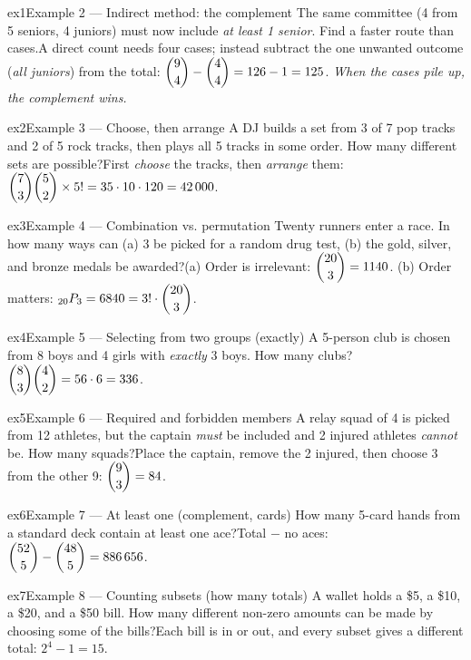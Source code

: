 \documentclass[11pt]{article}
\begin{document}
\begin{example}{ex1}{Example 2 --- Indirect method: the complement}
The same committee (4 from 5 seniors, 4 juniors) must now include \emph{at least 1 senior}. Find a faster route than cases.\soln A direct count needs four cases; instead subtract the one unwanted outcome (\emph{all juniors}) from the total: $\dbinom{9}{4}-\dbinom{4}{4}=126-1=125$. \emph{When the cases pile up, the complement wins.}
\end{example}

\begin{example}{ex2}{Example 3 --- Choose, then arrange}
A DJ builds a set from 3 of 7 pop tracks and 2 of 5 rock tracks, then plays all 5 tracks in some order. How many different sets are possible?\soln First \emph{choose} the tracks, then \emph{arrange} them: $\dbinom{7}{3}\dbinom{5}{2}\times5!=35\cdot10\cdot120=42\,000$.
\end{example}

\begin{example}{ex3}{Example 4 --- Combination vs. permutation}
Twenty runners enter a race. In how many ways can (a) 3 be picked for a random drug test, (b) the gold, silver, and bronze medals be awarded?\soln (a) Order is irrelevant: $\dbinom{20}{3}=1140$. (b) Order matters: $_{20}P_3=6840=3!\cdot\dbinom{20}{3}$.
\end{example}

\begin{example}{ex4}{Example 5 --- Selecting from two groups (exactly)}
A 5-person club is chosen from 8 boys and 4 girls with \emph{exactly} 3 boys. How many clubs?\soln $\dbinom{8}{3}\dbinom{4}{2}=56\cdot6=336$.
\end{example}

\begin{example}{ex5}{Example 6 --- Required and forbidden members}
A relay squad of 4 is picked from 12 athletes, but the captain \emph{must} be included and 2 injured athletes \emph{cannot} be. How many squads?\soln Place the captain, remove the 2 injured, then choose 3 from the other 9: $\dbinom{9}{3}=84$.
\end{example}

\begin{example}{ex6}{Example 7 --- At least one (complement, cards)}
How many 5-card hands from a standard deck contain at least one ace?\soln Total $-$ no aces: $\dbinom{52}{5}-\dbinom{48}{5}=886\,656$.
\end{example}

\begin{example}{ex7}{Example 8 --- Counting subsets (how many totals)}
A wallet holds a \$5, a \$10, a \$20, and a \$50 bill. How many different non-zero amounts can be made by choosing some of the bills?\soln Each bill is in or out, and every subset gives a different total: $2^4-1=15$.
\end{example}
\end{document}
